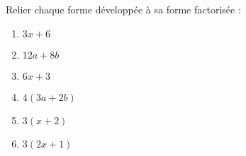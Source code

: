
\begin{exercice}\label{exo2smath-0102}

    Relier chaque forme développée à sa forme factorisée :
    \begin{multicols}{2}
        \begin{enumerate}
            \item
                \( 3x+6\)
            \item
                \( 12a+8b\)
            \item
                \( 6x+3\)
                \columnbreak
            \item
                \( 4(3a+2b)\)
            \item
                \( 3(x+2)\)
            \item
                \( 3(2x+1)\)
        \end{enumerate}
    \end{multicols}

\end{exercice}
